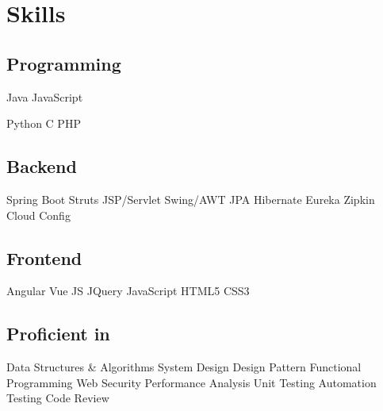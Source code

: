 \documentclass[]{deedy-resume-openfont}
\begin{document}
%
%
\lastupdated

%
%

%
%

\begin{minipage}[t]{0.33\textwidth} 



\section{Skills}
\subsection{Programming}
Java \textbullet{}   
JavaScript

Python \textbullet{} 
C \textbullet{} 
PHP
\sectionsep

\subsection{Backend}
Spring Boot \textbullet{} 
Struts \textbullet{} 
JSP/Servlet \textbullet{} 
Swing/AWT \textbullet{} 
JPA \textbullet{} 
Hibernate \textbullet{}\newline
Eureka \textbullet{} 
Zipkin \textbullet{} 
Cloud Config
\sectionsep

\subsection{Frontend}
Angular \textbullet{} 
Vue JS \textbullet{} 
JQuery \textbullet{} \newline
JavaScript \textbullet{} 
HTML5 \textbullet{} 
CSS3
\sectionsep

\subsection{Proficient in}
Data Structures \& 
Algorithms \textbullet{} 
System Design \textbullet{} 
Design Pattern \textbullet{} 
Functional Programming \textbullet{} 
Web Security \textbullet{} 
Performance Analysis \textbullet{} 
Unit Testing \textbullet{} 
Automation Testing \textbullet{} 
Code Review
\sectionsep


\end{minipage}
\end{document}

